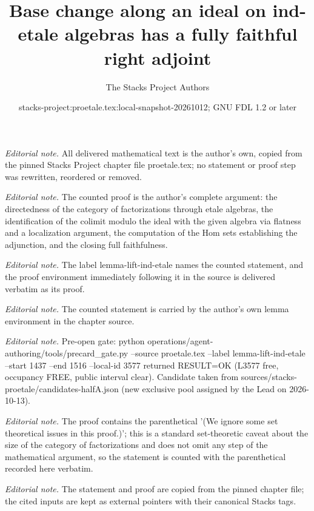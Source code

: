 \documentclass[10pt,a4paper]{amsart}
\title{Base change along an ideal on ind-etale algebras has a fully faithful right adjoint}
\author{The Stacks Project Authors}
\date{stacks-project:proetale.tex:local-snapshot-20261012; GNU FDL 1.2 or later}
\theoremstyle{plain}
\theoremstyle{definition}
\theoremstyle{remark}
\numberwithin{equation}{subsection}
\begin{document}
\maketitle
\noindent\textit{Editorial note.} All delivered mathematical text is the author's own, copied from the pinned Stacks Project chapter file proetale.tex; no statement or proof step was rewritten, reordered or removed.\par\medskip
\noindent\textit{Editorial note.} The counted proof is the author's complete argument: the directedness of the category of factorizations through etale algebras, the identification of the colimit modulo the ideal with the given algebra via flatness and a localization argument, the computation of the Hom sets establishing the adjunction, and the closing full faithfulness.\par\medskip
\noindent\textit{Editorial note.} The label lemma-lift-ind-etale names the counted statement, and the proof environment immediately following it in the source is delivered verbatim as its proof.\par\medskip
\noindent\textit{Editorial note.} The counted statement is carried by the author's own lemma environment in the chapter source.\par\medskip
\noindent\textit{Editorial note.} Pre-open gate: python operations/agent-authoring/tools/precard\_gate.py --source proetale.tex --label lemma-lift-ind-etale --start 1437 --end 1516 --local-id 3577 returned RESULT=OK (L3577 free, occupancy FREE, public interval clear). Candidate taken from sources/stacks-proetale/candidates-halfA.json (new exclusive pool assigned by the Lead on 2026-10-13).\par\medskip
\noindent\textit{Editorial note.} The proof contains the parenthetical '(We ignore some set theoretical issues in this proof.)'; this is a standard set-theoretic caveat about the size of the category of factorizations and does not omit any step of the mathematical argument, so the statement is counted with the parenthetical recorded here verbatim.\par\medskip
\noindent\textit{Editorial note.} The statement and proof are copied from the pinned chapter file; the cited inputs are kept as external pointers with their canonical Stacks tags.\par\medskip
\end{document}
